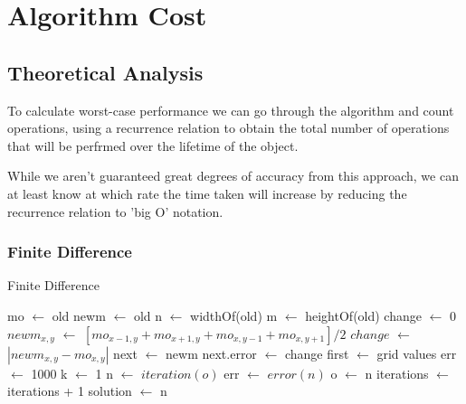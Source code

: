 \documentclass[aps,twocolumn,pre,nofootinbib,10pt]{revtex4-1}
\newcommand*\Let[2]{\State #1 $\gets$ #2}
\begin{document}
\section{Algorithm Cost}
\subsection{Theoretical Analysis}

To calculate worst-case performance we can go through the algorithm and count operations, using a recurrence relation to obtain the total number of operations that will be perfrmed over the lifetime of the object.

While we aren't guaranteed great degrees of accuracy from this approach, we can at least know at which rate the time taken will increase by reducing the recurrence relation to 'big O' notation.

\subsubsection{Finite Difference}
\begin{algorithm}
    \caption{Finite Difference}
    \label{alg:fd}
    \begin{algorithmic}[1]
            \Let{mo}{old}
            \Let{newm}{old}
            \Let{n}{widthOf(old)}
            \Let{m}{heightOf(old)}
            \Let{change}{0}
                        \Let{$newm_{x,y}$}{$[{mo_{x-1,y}+mo_{x+1,y}+mo_{x,y-1}+mo_{x,y+1}}] / {2}$}
                    \EndIf
                        \Let{$change$}{$|newm_{x,y}-mo_{x,y}|$}
                    \EndIf
                \EndFor
            \EndFor
            \Let{next}{newm}
            \Let{next.error}{change}
            \State {}
        \EndFunction
            \Let{first}{grid values}
            \Let{err}{1000}
            \Let{k}{1}
                \Let{n}{$iteration(o)$}
                \Let{err}{$error(n)$}
                \Let{o}{n}
                \Let{iterations}{iterations + 1}
            \EndWhile
            \Let{solution}{n}
            \State {}
        \EndFunction
    \end{algorithmic}
\end{algorithm}
\end{document}
